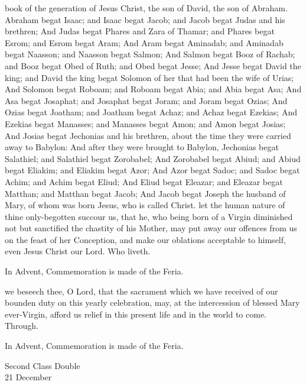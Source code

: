  book of the generation of Jesus Christ, the son of David, the son of Abraham. Abraham begat Isaac; and Isaac begat Jacob; and Jacob begat Judas and his brethren; And Judas begat Phares and Zara of Thamar; and Phares begat Esrom; and Esrom begat Aram; And Aram begat Aminadab; and Aminadab begat Naasson; and Naasson begat Salmon; And Salmon begat Booz of Rachab; and Booz begat Obed of Ruth; and Obed begat Jesse; And Jesse begat David the king; and David the king begat Solomon of her that had been the wife of Urias; And Solomon begat Roboam; and Roboam begat Abia; and Abia begat Asa; And Asa begat Josaphat; and Josaphat begat Joram; and Joram begat Ozias; And Ozias begat Joatham; and Joatham begat Achaz; and Achaz begat Ezekias; And Ezekias begat Manasses; and Manasses begat Amon; and Amon begat Josias; And Josias begat Jechonias and his brethren, about the time they were carried away to Babylon: And after they were brought to Babylon, Jechonias begat Salathiel; and Salathiel begat Zorobabel; And Zorobabel begat Abiud; and Abiud begat Eliakim; and Eliakim begat Azor; And Azor begat Sadoc; and Sadoc begat Achim; and Achim begat Eliud; And Eliud begat Eleazar; and Eleazar begat Matthan; and Matthan begat Jacob; And Jacob begat Joseph the husband of Mary, of whom was born Jesus, who is called Christ.
\secret
{} let the human nature of thine only-begotten succour us, that he, who being born of a Virgin diminished not but sanctified the chastity of his Mother, may put away our offences from us on the feast of her Conception, and make our oblations acceptable to himself, even Jesus Christ our Lord. Who liveth.
\begin{rubric}
    In Advent, Commemoration is made of the Feria.
\end{rubric}

\postcommunion
{} we beseech thee, O Lord, that the sacrament which we have received of our bounden duty on this yearly celebration, may, at the intercession of blessed Mary ever-Virgin, afford us relief in this present life and in the world to come. Through.
\begin{rubric}
    In Advent, Commemoration is made of the Feria.
\end{rubric}

\begin{inhead}
    {Second Class Double\\
21 December}
\end{inhead}
\par\noindent
{}

